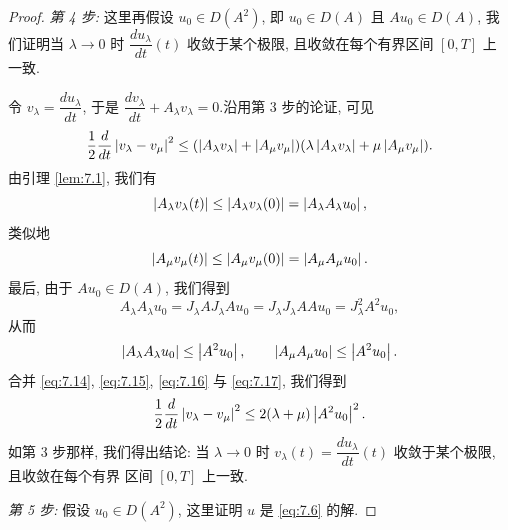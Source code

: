 \begin{proof}
\emph{第 4 步:} 这里再假设 $u_0\in D(A^2)$, 即 $u_0\in D(A)$ 且
$Au_0\in D(A)$, 我们证明当 $\lambda\to0$ 时
$\dfrac{du_\lambda}{dt}(t)$ 收敛于某个极限, 且收敛在每个有界区间 $[0,T]$ 上
一致.

令 $v_\lambda=\dfrac{du_\lambda}{dt}$, 于是
$\dfrac{dv_\lambda}{dt}+A_\lambda v_\lambda=0$.沿用第 3 步的论证, 可见
\begin{equation}
\frac12\frac{d}{dt}\left|v_\lambda-v_\mu\right|^2
\le(\left|A_\lambda v_\lambda\right|+\left|A_\mu v_\mu\right|)
(\lambda\left|A_\lambda v_\lambda\right|+\mu\left|A_\mu v_\mu\right|).
\label{eq:7.14}
\end{equation}
由引理  \ref{lem:7.1}, 我们有
\begin{equation}
\left|A_\lambda v_\lambda(t)\right|\le\left|A_\lambda v_\lambda(0)\right|
=\left|A_\lambda A_\lambda u_0\right|,
\label{eq:7.15}
\end{equation}
类似地
\begin{equation}
\left|A_\mu v_\mu(t)\right|\le\left|A_\mu v_\mu(0)\right|
=\left|A_\mu A_\mu u_0\right|.
\label{eq:7.16}
\end{equation}
最后, 由于 $Au_0\in D(A)$, 我们得到
\begin{equation*}
A_\lambda A_\lambda u_0=J_\lambda AJ_\lambda Au_0
=J_\lambda J_\lambda AAu_0=J_\lambda^2A^2u_0,
\end{equation*}
从而
\begin{equation}
\left|A_\lambda A_\lambda u_0\right|\le\left|A^2u_0\right|,
\qquad
\left|A_\mu A_\mu u_0\right|\le\left|A^2u_0\right|.
\label{eq:7.17}
\end{equation}
合并 \eqref{eq:7.14}, \eqref{eq:7.15}, \eqref{eq:7.16} 与
\eqref{eq:7.17}, 我们得到
\begin{equation*}
\frac12\frac{d}{dt}\left|v_\lambda-v_\mu\right|^2
\le2(\lambda+\mu)\left|A^2u_0\right|^2.
\end{equation*}
如第 3 步那样, 我们得出结论: 当 $\lambda\to0$ 时
$v_\lambda(t)=\dfrac{du_\lambda}{dt}(t)$ 收敛于某个极限, 且收敛在每个有界
区间 $[0,T]$ 上一致.

\emph{第 5 步:} 假设 $u_0\in D(A^2)$, 这里证明 $u$ 是 \eqref{eq:7.6} 的解.


\end{proof}
